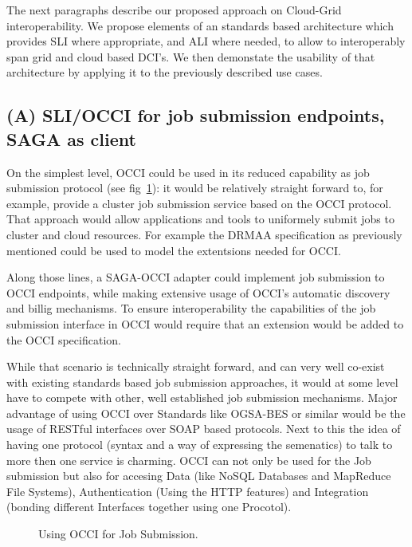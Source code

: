 \documentclass[10pt,conference,final,letterpaper,twoside,twocolumn,]{IEEEtran}
\begin{document}
The next paragraphs describe our proposed approach on Cloud-Grid
interoperability. We propose elements of an standards based
architecture which provides SLI where appropriate, and ALI where
needed, to allow to interoperably span grid and cloud based DCI's.  We
then demonstate the usability of that architecture by applying it to
the previously described use cases.

\subsection{(A) SLI/OCCI for job submission endpoints, SAGA as client}

On the simplest level, OCCI could be used in its reduced capability as
job submission protocol (see fig~\ref{fig:arch1}): it would be
relatively straight forward to, for example, provide a cluster job
submission service based on the OCCI protocol. That approach would
allow applications and tools to uniformely submit jobs to cluster and
cloud resources. For example the DRMAA specification as previously
mentioned could be used to model the extentsions needed for OCCI.

Along those lines, a SAGA-OCCI adapter could implement job submission
to OCCI endpoints, while making extensive usage of OCCI's automatic
discovery and billig mechanisms. To ensure interoperability the
capabilities of the job submission interface in OCCI would require
that an extension would be added to the OCCI specification.

While that scenario is technically straight forward, and can very well
co-exist with existing standards based job submission approaches, it
would at some level have to compete with other, well established job
submission mechanisms. Major advantage of using OCCI over Standards
like OGSA-BES or similar would be the usage of RESTful interfaces over
SOAP based protocols. Next to this the idea of having one protocol
(syntax and a way of expressing the semenatics) to talk to more then
one service is charming. OCCI can not only be used for the Job
submission but also for accesing Data (like NoSQL Databases and
MapReduce File Systems), Authentication (Using the HTTP features) and
Integration (bonding different Interfaces together using one
Procotol).

\begin{figure}[htb]
 \caption{\label{fig:arch1} Using OCCI for Job Submission.}
\end{figure}
\end{document}

